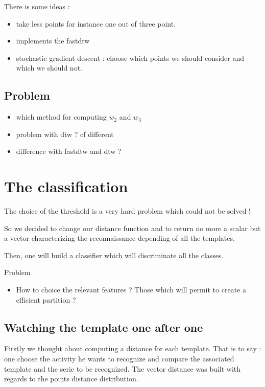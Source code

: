 \documentclass[a4,12pt]{article}
\begin{document}
	There is some ideas :
	
	\begin{itemize}
		\item take less points for instance one out of three point.
		\item implements the fastdtw
		\item stochastic gradient descent : choose which points we should consider and which we should not.
	\end{itemize}
	
	\subsection{Problem}
	
	\begin{itemize}
		\item which method for computing $w_2$ and $w_3$
		\item problem with dtw ? cf different
		\item difference with fastdtw and dtw ?
	\end{itemize}
	
	\section{The classification}
	
	The choice of the threshold is a very hard problem which could not be solved ! 
	
	So we decided to change our distance function and to return no more a scalar but a vector characterizing the reconnaissance depending of all the templates.
	
	Then, one will build a classifier which will discriminate all the classes.
	
	Problem
	\begin{itemize}
		\item How to choice the relevant features ? Those which will permit to create a efficient partition ?
	\end{itemize}
	
	\subsection{Watching the template one after one}
	
	Firstly we thought about computing a distance for each template. That is to say : one choose the activity he wants to recognize and compare the associated template and the serie to be recognized. The vector distance was built with regards to the points distance distribution.
\end{document}

